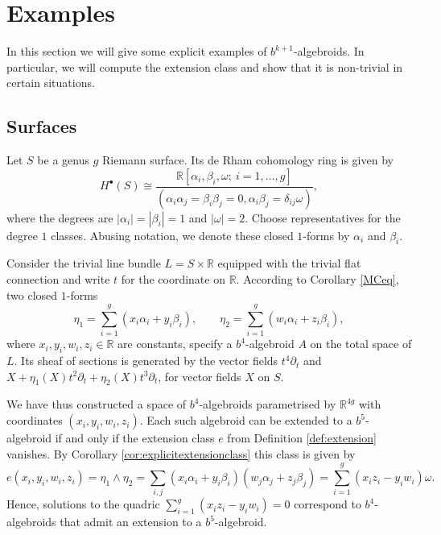\documentclass[10pt]{amsart}
\newcommand{\RR}{\mathbb{R}}
\numberwithin{theoremalpha}{section}
\numberwithin{equation}{section}
\numberwithin{definition}{section}
\numberwithin{theorem}{section}
\numberwithin{proposition}{section}
\numberwithin{lemma}{section}
\numberwithin{example}{section}
\numberwithin{remark}{section}
\numberwithin{corollary}{section}
\numberwithin{question}{section}
\numberwithin{problem}{section}
\numberwithin{assumption}{section}
\theoremstyle{named}
\numberwithin{equation}{section}
\begin{document}
\section{Examples}\label{sec:Examples1}
In this section we will give some explicit examples of $b^{k+1}$-algebroids. In particular, we will compute the extension class and show that it is non-trivial in certain situations.

\subsection{Surfaces} \label{ex:genusgsurfaceexampleextension}

Let $S$ be a genus $g$ Riemann surface. Its de Rham cohomology ring is given by 
\[ H^{\bullet}(S) \cong \dfrac{\RR[\alpha_{i}, \beta_{i}, \omega ; \ i = 1, ..., g]}{(\alpha_{i} \alpha_{j} = \beta_{i} \beta_{j} = 0, \alpha_{i} \beta_{j} = \delta_{ij} \omega)}, \]
where the degrees are $|\alpha_{i}| = |\beta_{i}| = 1$ and $|\omega| = 2$. Choose representatives for the degree $1$ classes. Abusing notation, we denote these closed $1$-forms by $\alpha_{i}$ and $\beta_{i}$.

Consider the trivial line bundle $L = S \times \RR$ equipped with the trivial flat connection and write $t$ for the coordinate on $\RR$. According to Corollary \ref{MCeq}, two closed $1$-forms 
\[ \eta_{1} = \sum_{i = 1}^{g} (x_{i} \alpha_{i} + y_{i} \beta_{i}), \qquad \eta_{2} = \sum_{i = 1}^{g} (w_{i} \alpha_{i} + z_{i} \beta_{i}), \]
where $x_{i}, y_{i}, w_{i}, z_{i} \in \mathbb{R}$ are constants, specify a $b^{4}$-algebroid $A$ on the total space of $L$. Its sheaf of sections is generated by the vector fields $t^{4} \partial_{t}$ and $X + \eta_{1}(X) t^2 \partial_{t} + \eta_{2}(X) t^3 \partial_{t}$, for vector fields $X$ on $S$.

We have thus constructed a space of $b^4$-algebroids parametrised by $\RR^{4g}$ with coordinates $(x_{i}, y_{i}, w_{i}, z_{i})$. Each such algebroid can be extended to a $b^{5}$-algebroid if and only if the extension class $e$ from Definition \ref{def:extension} vanishes. By Corollary \ref{cor:explicitextensionclass} this class is given by
\[ e(x_{i}, y_{i}, w_{i}, z_{i}) = \eta_{1} \wedge \eta_{2} = \sum_{i,j} (x_{i} \alpha_{i} + y_{i} \beta_{i})  (w_{j} \alpha_{j} + z_{j} \beta_{j}) = \sum_{i = 1}^{g} (x_{i} z_{i} - y_{i} w_{i}) \omega. \]
Hence, solutions to the quadric $ \sum_{i = 1}^{g} (x_{i} z_{i} - y_{i} w_{i}) = 0$ correspond to $b^4$-algebroids that admit an extension to a $b^5$-algebroid. 
\end{document}
